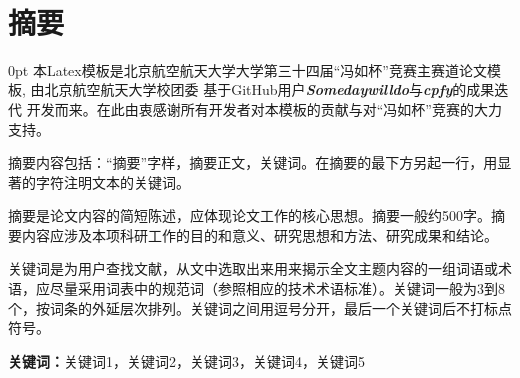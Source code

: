 \documentclass[zihao=-4]{ctexart}
\newcommand{\sanhao}{\fontsize{16pt}{0}}
\newcommand{\xiaosi}{\fontsize{12pt}{0}}
\newcommand{\setParDis}{\setlength {\parskip} {0pt} }
\begin{document}
\par \ 
\begin{center}
\sanhao
\centerline{\heiti{}}%
\end{center}



\renewcommand{\headrulewidth}{0pt}%
\clearpage
{} %

\xiaosi
\section*{摘要}
\begin{spacing}{1.5}
  \setParDis %
  本Latex模板是北京航空航天大学大学第三十四届“冯如杯”竞赛主赛道论文模板, 由北京航空航天大学校团委
基于GitHub用户\textbf{\textit{Somedaywilldo}}与\textbf{\textit{cpfy}}的成果迭代
开发而来。在此由衷感谢所有开发者对本模板的贡献与对“冯如杯”竞赛的大力支持。

摘要内容包括：“摘要”字样，摘要正文，关键词。在摘要的最下方另起一行，用显著的字符注明文本的关键词。

摘要是论文内容的简短陈述，应体现论文工作的核心思想。摘要一般约500字。摘要内容应涉及本项科研工作的目的和意义、研究思想和方法、研究成果和结论。

关键词是为用户查找文献，从文中选取出来用来揭示全文主题内容的一组词语或术语，应尽量采用词表中的规范词（参照相应的技术术语标准）。关键词一般为3到8个，按词条的外延层次排列。关键词之间用逗号分开，最后一个关键词后不打标点符号。

\end{spacing}
    
\textbf{关键词：}关键词1，关键词2，关键词3，关键词4，关键词5

\newpage
\end{document}
